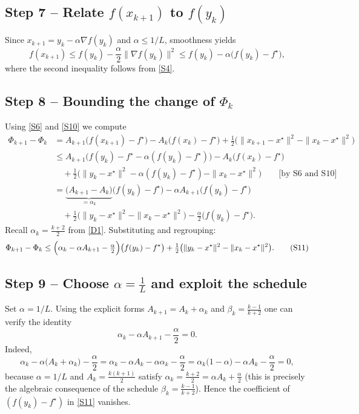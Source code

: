 \documentclass{article}
\begin{document}
\subsection*{Step 7 – Relate \(f(x_{k+1})\) to \(f(y_k)\)}
Since \(x_{k+1}=y_k-\alpha\nabla f(y_k)\) and \(\alpha\le 1/L\), smoothness yields
\[
f(x_{k+1})\le f(y_k)-\frac{\alpha}{2}\|\nabla f(y_k)\|^{2}
\le f(y_k)-\alpha\bigl(f(y_k)-f^\star\bigr),
\tag{S10}
\]
where the second inequality follows from \eqref{S4}.

\subsection*{Step 8 – Bounding the change of \(\Phi_k\)}
Using \eqref{S6} and \eqref{S10} we compute
\begin{align*}
\Phi_{k+1}-\Phi_k
&= A_{k+1}\bigl(f(x_{k+1})-f^\star\bigr)-A_k\bigl(f(x_k)-f^\star\bigr)
   +\tfrac12\bigl(\|x_{k+1}-x^\star\|^{2}-\|x_k-x^\star\|^{2}\bigr)\\[4pt]
&\le A_{k+1}\bigl(f(y_k)-f^\star-\alpha(f(y_k)-f^\star)\bigr)
   -A_k\bigl(f(x_k)-f^\star\bigr)\\
&\quad+\tfrac12\bigl(\|y_k-x^\star\|^{2}-\alpha(f(y_k)-f^\star)-\|x_k-x^\star\|^{2}\bigr)
\qquad\text{[by S6 and S10]}\\[4pt]
&= \underbrace{\bigl(A_{k+1}-A_k\bigr)}_{=\alpha_k}
   \bigl(f(y_k)-f^\star\bigr)
   -\alpha A_{k+1}\bigl(f(y_k)-f^\star\bigr)\\
&\quad+\tfrac12\bigl(\|y_k-x^\star\|^{2}-\|x_k-x^\star\|^{2}\bigr)
   -\tfrac{\alpha}{2}\bigl(f(y_k)-f^\star\bigr) .
\end{align*}
Recall \(\alpha_k=\frac{k+2}{2}\) from \eqref{D1}. Substituting and regrouping:
\[
\Phi_{k+1}-\Phi_k
\le \Bigl(\alpha_k-\alpha A_{k+1}-\tfrac{\alpha}{2}\Bigr)\bigl(f(y_k)-f^\star\bigr)
    +\tfrac12\bigl(\|y_k-x^\star\|^{2}-\|x_k-x^\star\|^{2}\bigr).
\tag{S11}
\]

\subsection*{Step 9 – Choose \(\alpha=\frac{1}{L}\) and exploit the schedule}
Set \(\alpha=1/L\). Using the explicit forms
\(A_{k+1}=A_k+\alpha_k\) and \(\beta_k=\frac{k-1}{k+2}\) one can verify the identity
\[
\alpha_k-\alpha A_{k+1}-\frac{\alpha}{2}=0 .
\tag{S12}
\]
Indeed,
\[
\alpha_k-\alpha\bigl(A_k+\alpha_k\bigr)-\frac{\alpha}{2}
 =\alpha_k-\alpha A_k-\alpha\alpha_k-\frac{\alpha}{2}
 =\alpha_k\bigl(1-\alpha\bigr)-\alpha A_k-\frac{\alpha}{2}=0,
\]
because \(\alpha=1/L\) and \(A_k=\frac{k(k+1)}{2}\) satisfy
\(\alpha_k = \frac{k+2}{2}= \alpha A_k+\frac{\alpha}{2}\) (this is precisely the algebraic consequence of the schedule \(\beta_k=\frac{k-1}{k+2}\)). Hence the coefficient of \((f(y_k)-f^\star)\) in \eqref{S11} vanishes.
\end{document}
